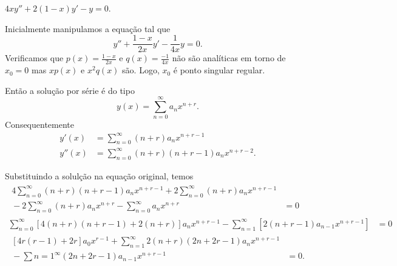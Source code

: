 \documentclass[a4paper,12pt, leqno, answers]{exam}
\begin{document}
\begin{questions}
    \question $4 x y'' + 2 \left( 1 - x \right) y' - y = 0$.
    \begin{solution}
        Inicialmente manipulamos a equa\c{c}\~{a}o tal que
        \[
        y'' + \frac{1 - x}{2 x} y' - \frac{1}{4x} y = 0.
        \]
        Verificamos que $p(x) = \frac{1 - x}{2x}$ e $q(x) = \frac{-1}{4x}$ n\~{a}o s\~{a}o anal\'{i}ticas em torno de $x_0 = 0$ mas $x p(x)$ e $x^2 q(x)$ s\~{a}o. Logo, $x_0$ \'{e} ponto singular regular.

        Ent\~{a}o a solu\c{c}\~{a}o por s\'{e}rie \'{e} do tipo
        \[
        y\left( x \right) = \sum_{n = 0}^\infty a_n x^{n + r}.
        \]
        Consequentemente
        \begin{align*}
            y'(x) &= \sum_{n = 0}^\infty \left( n + r \right) a_n x^{n + r - 1} \\
            y''(x) &= \sum_{n = 0}^\infty \left( n + r \right) \left( n + r - 1 \right) a_n x^{n + r - 2}.
        \end{align*}

        Substituindo a solul\c{c}\~{a}o na equa\c{c}\~{a}o original, temos
        \begin{align*}
            \begin{split}
                4 \sum_{n = 0}^\infty \left( n + r \right) \left( n + r - 1 \right) a_n x^{n + r - 1} + 2 \sum_{n = 0}^\infty \left( n + r \right) a_n x^{n + r - 1} \\ {}- 2 \sum_{n = 0}^\infty \left( n + r \right) a_n x^{n + r} - \sum_{n = 0}^\infty a_n x^{n + r} &= 0
            \end{split} \\
            \sum_{n = 0}^\infty \left[ 4 \left( n + r \right) \left( n + r - 1 \right) + 2 \left( n + r \right) \right] a_n x^{n + r - 1} - \sum_{n = 1}^\infty \left[ 2 \left( n + r - 1 \right) a_{n - 1} x^{n + r - 1} \right] &= 0 \\
            \begin{split}
                \left[ 4 r \left( r - 1 \right) + 2 r \right] a_0 x^{r - 1} + \sum_{n = 1}^\infty 2 \left( n + r \right) \left( 2 n + 2 r - 1 \right) a_n x^{n + r - 1} \\ {}- \sum{n = 1}^\infty \left( 2 n + 2 r - 1 \right) a_{n - 1} x^{n + r - 1} &= 0.
            \end{split}
        \end{align*}


\end{solution}
\end{questions}
\end{document}
